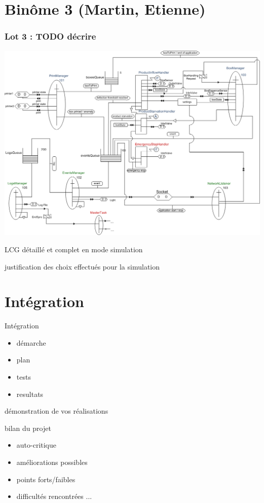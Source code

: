 \documentclass{beamer}
\begin{document}
\section{Binôme 3 (Martin, Etienne)}
	\begin{frame}
	\begin{center}
		\frametitle{Lot 3 : TODO décrire}
		\includegraphics[height=0.8\textheight]{../../SchemasLCG/schemaGlobal.png}
	\end{center}
	\end{frame}

	\begin{frame}
		LCG détaillé et complet en mode simulation
	\end{frame}

	\begin{frame}
		justification des choix effectués pour la simulation 
	\end{frame}

\section{Intégration}
	\begin{frame}
		Intégration
		\begin{itemize}
			\item démarche
			\item plan
			\item tests
			\item resultats
		\end{itemize}
	\end{frame}

	\begin{frame}
		démonstration de vos réalisations
	\end{frame}

	\begin{frame}
		bilan du projet
		\begin{itemize}
			\item auto-critique
			\item améliorations possibles
			\item points forts/faibles
			\item difficultés rencontrées ...
		\end{itemize}
	\end{frame}
\end{document}
